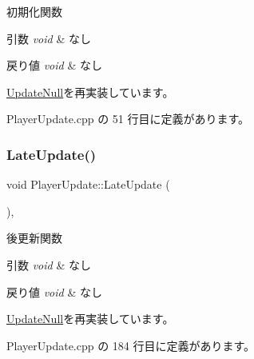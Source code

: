 初期化関数 


\begin{DoxyParams}{引数}
{\em void} & なし \\
\hline
\end{DoxyParams}

\begin{DoxyRetVals}{戻り値}
{\em void} & なし \\
\hline
\end{DoxyRetVals}


\mbox{\hyperlink{class_update_null_abe9bc57c7932d2de47073c2709007432}{Update\+Null}}を再実装しています。



 Player\+Update.\+cpp の 51 行目に定義があります。

\mbox{\label{class_player_update_ae376f517f3458edfef61ac366aa78e36}} 
\subsubsection{\texorpdfstring{Late\+Update()}{LateUpdate()}}
{\footnotesize\ttfamily void Player\+Update\+::\+Late\+Update (\begin{DoxyParamCaption}{ }\end{DoxyParamCaption})\hspace{0.3cm}{\ttfamily [override]}, {\ttfamily [virtual]}}



後更新関数 


\begin{DoxyParams}{引数}
{\em void} & なし \\
\hline
\end{DoxyParams}

\begin{DoxyRetVals}{戻り値}
{\em void} & なし \\
\hline
\end{DoxyRetVals}


\mbox{\hyperlink{class_update_null_ac68da1ba7f3fbcae833442bb1c169200}{Update\+Null}}を再実装しています。



 Player\+Update.\+cpp の 184 行目に定義があります。

\mbox{\label{class_player_update_a997e0813a825d7525da4b5b89a290168}} 
